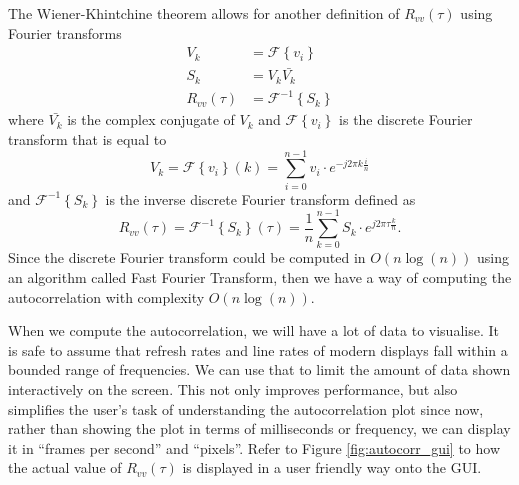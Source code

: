 \documentclass[a4paper,12pt,twoside,openright]{report}
\begin{document}
The Wiener-Khintchine theorem \cite{wiener1964} allows for another definition of $R_{vv}(\tau)$ using Fourier transforms
\begin{equation}
	\begin{aligned}
	V_{k} & = \mathcal{F} \left\{ v_{i} \right\} \\
	S_{k} & = V_{k} \bar{V_{k}} \\
	R_{vv}(\tau) & = \mathcal{F}^{-1} \left\{ S_{k} \right\}
	\end{aligned}
\end{equation}
where $\bar{V_{k}}$ is the complex conjugate of $V_{k}$ and $\mathcal{F} \left\{ v_{i} \right\}$ is the discrete Fourier transform that is equal to
$$V_{k}=\mathcal{F} \left\{ v_{i} \right\} (k) = \sum_{i = 0}^{n-1} v_{i} \cdot e^{- j 2 \pi k \frac{i}{n}} $$
and $\mathcal{F}^{-1} \left\{ S_{k} \right\}$ is the inverse discrete Fourier transform defined as
$$R_{vv}(\tau)=\mathcal{F}^{-1} \left\{ S_{k} \right\} (\tau) = \frac{1}{n} \sum_{k = 0}^{n-1} S_{k} \cdot e^{j 2 \pi \tau \frac{k}{n}}. $$
Since the discrete Fourier transform could be computed in $O(n \log(n))$ using an algorithm called Fast Fourier Transform, then we have a way of computing the autocorrelation with complexity $O(n \log(n))$.

When we compute the autocorrelation, we will have a lot of data to visualise. It is safe to assume that refresh rates and line rates of modern displays fall within a bounded range of frequencies. We can use that to limit the amount of data shown interactively on the screen. This not only improves performance, but also simplifies the user's task of understanding the autocorrelation plot since now, rather than showing the plot in terms of milliseconds or frequency, we can display it in ``frames per second'' and ``pixels''. Refer to Figure \ref{fig:autocorr_gui} to how the actual value of $R_{vv}(\tau)$ is displayed in a user friendly way onto the GUI.
\end{document}
